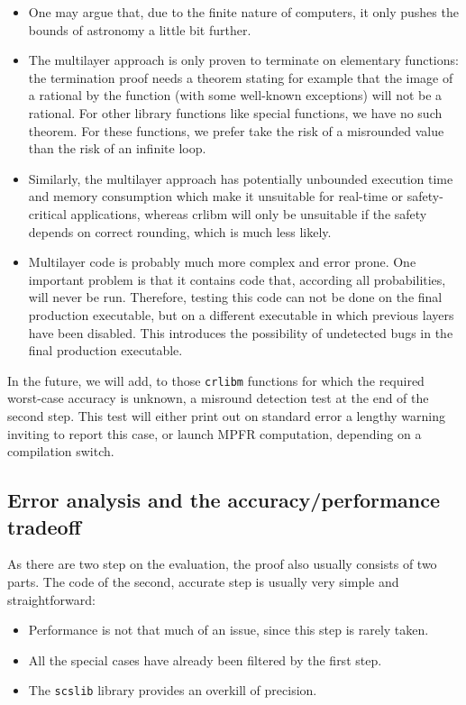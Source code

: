 \begin{itemize}

\item One may argue that, due to the finite nature of computers, it
  only pushes the bounds of astronomy a little bit further.

\item The multilayer approach is only proven to terminate on
  elementary functions: the termination proof needs a theorem stating
  for example that the image of a rational by the function (with some
  well-known exceptions) will not be a rational. For other library
  functions like  special functions, we have no such theorem.
  For these functions, we prefer take the risk of a misrounded
  value than the risk of an infinite loop.

\item Similarly, the multilayer approach has potentially unbounded
  execution time and memory consumption which make it unsuitable for
  real-time or safety-critical applications, whereas crlibm will only
  be unsuitable if the safety depends on correct rounding, which is
  much less likely.

\item Multilayer code is probably much more complex and error prone.
  One important problem is that it contains code that, according all
  probabilities, will never be run. Therefore, testing this code can
  not be done on the final production executable, but on a different
  executable in which previous layers have been disabled. This
  introduces the possibility of undetected bugs in the final
  production executable.

\end{itemize}

In the future, we will add, to those \texttt{crlibm} functions for
which the required worst-case accuracy is unknown, a misround
detection test at the end of the second step. This test will either
print out on standard error a lengthy warning inviting to report this
case, or launch MPFR computation, depending on a compilation switch.



\subsection{Error analysis and the accuracy/performance tradeoff
  \label{sec:error-accuracy-perf}}

As there are two step on the evaluation, the proof also usually
consists of two parts. The code of the second, accurate step is
usually very simple and straightforward:
\begin{itemize}
\item Performance is not that much of an issue, since this step is rarely taken.
\item All the special cases have already been filtered by the first step.
\item The \texttt{scslib} library provides an overkill of precision.
\end{itemize}

